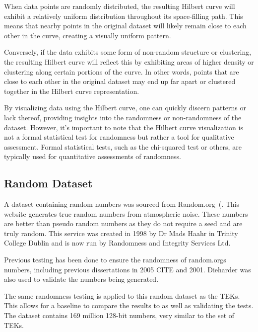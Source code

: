 When data points are randomly distributed, the resulting Hilbert curve will exhibit a relatively uniform distribution throughout its space-filling path. This means that nearby points in the original dataset will likely remain close to each other in the curve, creating a visually uniform pattern.

Conversely, if the data exhibits some form of non-random structure or clustering, the resulting Hilbert curve will reflect this by exhibiting areas of higher density or clustering along certain portions of the curve. In other words, points that are close to each other in the original dataset may end up far apart or clustered together in the Hilbert curve representation.

By visualizing data using the Hilbert curve, one can quickly discern patterns or lack thereof, providing insights into the randomness or non-randomness of the dataset. However, it's important to note that the Hilbert curve visualization is not a formal statistical test for randomness but rather a tool for qualitative assessment. Formal statistical tests, such as the chi-squared test or others, are typically used for quantitative assessments of randomness.

\subsection{Random Dataset}

A dataset containing random numbers was sourced from Random.org~(\cite{Haahr1998}. This website generates true random numbers from atmospheric noise. These numbers are better than pseudo random numbers as they do not require a seed and are truly random. This service was created in 1998 by Dr Mads Haahr in Trinity College Dublin and is now run by Randomness and Integrity Services Ltd. \newline

Previous testing has been done to ensure the randomness of random.orgs numbers, including previous dissertations in 2005 CITE and 2001. Dieharder was also used to validate the numbers being generated. \newline

The same randomness testing is applied to this random dataset as the TEKs. This allows for a baseline to compare the results to as well as validating the tests.  The dataset contains 169 million 128-bit numbers, very similar to the set of TEKs.
